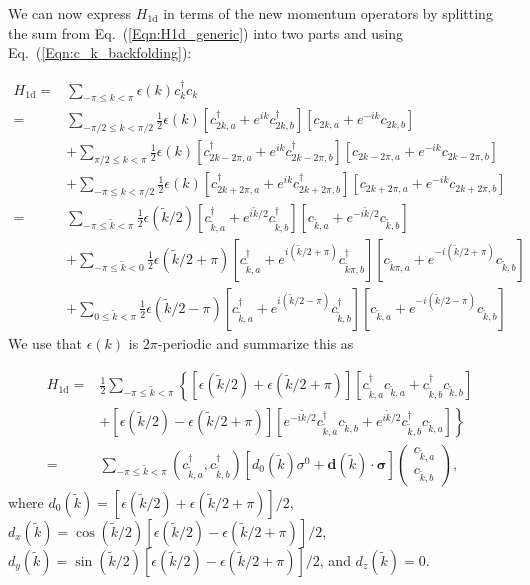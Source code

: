 \documentclass[english]{scrartcl}
\newcommand{\eq}[1]{Eq.~(\ref{#1})}
\begin{document}
We can now express $H_\mathrm{1d}$ in terms of the new momentum operators by splitting the sum from \eq{Eqn:H1d_generic} into two parts and using \eq{Eqn:c_k_backfolding}:

\begin{align*}
H_\mathrm{1d} =& \sum_{- \pi \leq k < \pi} \epsilon(k) c^\dagger_k c_k \\
 =&  \sum_{- \pi / 2 \leq k < \pi/2} \frac{1}{2} \epsilon(k) \left[ c^\dagger_{2k, a} + e^{ik} c^\dagger_{2k, b} \right]  \left[ c_{2k, a} + e^{-ik} c_{2k, b} \right] \\
&+ \sum_{\pi / 2 \leq k < \pi} \frac{1}{2} \epsilon(k) \left[ c^\dagger_{2k - 2 \pi, a} + e^{ik} c^\dagger_{2k - 2 \pi, b} \right]  \left[ c_{2k - 2 \pi, a} + e^{-ik} c_{2k - 2 \pi, b} \right] \\
&+ \sum_{- \pi \leq k < \pi/2} \frac{1}{2} \epsilon(k) \left[ c^\dagger_{2k + 2 \pi, a} + e^{ik} c^\dagger_{2k + 2 \pi, b} \right]  \left[ c_{2k + 2 \pi, a} + e^{-ik} c_{2k + 2 \pi, b} \right] \\
 =&  \sum_{-\pi \leq \tilde k < \pi} \frac{1}{2}  \epsilon(\tilde k / 2) \left[ c^\dagger_{\tilde k, a} + e^{i \tilde k / 2} c^\dagger_{\tilde k, b} \right]  \left[ c_{\tilde k, a} + e^{-i \tilde k / 2} c_{\tilde k, b} \right] \\
&+ \sum_{- \pi \leq \tilde k < 0} \frac{1}{2} \epsilon(\tilde k / 2 + \pi) \left[ c^\dagger_{\tilde k, a} + e^{i (\tilde k / 2 + \pi)} c^\dagger_{\tilde k \pi, b} \right]  \left[ c_{\tilde k \pi, a} + e^{-i(\tilde k / 2 + \pi)} c_{\tilde k, b} \right] \\
&+ \sum_{0 \leq \tilde k < \pi} \frac{1}{2} \epsilon(\tilde k / 2 - \pi) \left[ c^\dagger_{\tilde k, a} + e^{i(\tilde k / 2 - \pi)} c^\dagger_{\tilde k, b} \right]  \left[ c_{\tilde k, a} + e^{-i(\tilde k / 2 - \pi)} c_{\tilde k, b} \right] 
\end{align*}
We use that $\epsilon(k)$ is $2\pi$-periodic and summarize this as 

\begin{align*}
H_\mathrm{1d} =& \frac{1}{2} \sum_{-\pi \leq \tilde k < \pi} \left \{ \left[\epsilon(\tilde k / 2) + \epsilon(\tilde k / 2 + \pi) \right]  \left[ c^\dagger_{\tilde k, a}c_{\tilde k, a} + c^\dagger_{\tilde k, b}c_{\tilde k, b} \right] \right. \\
& \left . + \left[\epsilon(\tilde k / 2) - \epsilon(\tilde k / 2 + \pi) \right] \left[e^{-i\tilde k / 2} c^\dagger_{\tilde k, a}c_{\tilde k, b} + e^{i\tilde k / 2} c^\dagger_{\tilde k, b}c_{\tilde k, a} \right] \right \} \\
=& \sum_{-\pi \leq \tilde k < \pi} \left(c^\dagger_{\tilde k, a}, c^\dagger_{\tilde k, b}\right) 
\left[ d_0(\tilde k) \sigma^0 + \bm d(\tilde k) \cdot \bm \sigma \right] 
\begin{pmatrix}
c_{\tilde k, a} \\
c_{\tilde k, b}
\end{pmatrix},
\end{align*}
where $d_0(\tilde k) = [\epsilon(\tilde k / 2) + \epsilon(\tilde k / 2 + \pi)] / 2$, $d_x(\tilde k) = \cos(\tilde k /2)[\epsilon(\tilde k / 2) - \epsilon(\tilde k / 2 + \pi)] / 2$, $d_y(\tilde k) = \sin(\tilde k /2)[\epsilon(\tilde k / 2) - \epsilon(\tilde k / 2 + \pi)] / 2$, and $d_z(\tilde k) = 0$.
\end{document}
